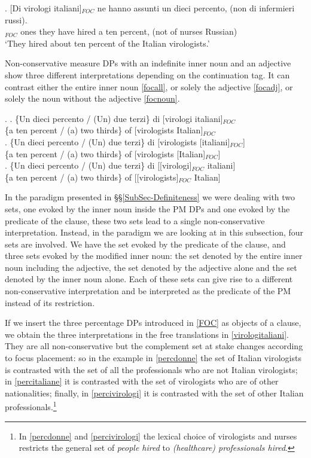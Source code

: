 \documentclass[charis, linguex]{glossa}
\begin{document}
\exg. [Di virologi italiani]$_{FOC}$ ne hanno assunti un dieci percento, (non di infermieri russi).\\
	 [of virologists Italian]$_{FOC}$ ones {they have} hired a ten percent, (not of nurses Russian)\\
	\glt   `They hired about ten percent of the Italian virologists.'  \label{fronted}

 
Non-conservative measure DPs with an indefinite inner noun and an adjective show three different interpretations depending on the continuation tag. It can contrast either the entire inner noun \ref{focall}, or solely the adjective \ref{focadj}, or solely the noun without the adjective \ref{focnoun}.

\ex. \label{FOC} \ag. \{Un dieci percento / (Un) due terzi\} di [virologi italiani]$_{FOC}$ \\ 
          \{a ten percent    /     (a) two thirds\} of [virologists Italian]$_{FOC}$ \\ \label{focall}
     \bg. \{Un dieci percento / (Un) due terzi\} di [virologists [italiani]$_{FOC}$] \\
	      \{a ten percent / (a) two thirds\} of [virologists [Italian]$_{FOC}$]  \\ \label{focadj}
	 \cg. \{Un dieci percento / (Un) due terzi\} di [[virologi]$_{FOC}$ italiani] \\
	      \{a ten percent / (a) two thirds\} of [[virologists]$_{FOC}$ Italian]  \\ \label{focnoun}

		  
		  
In the paradigm presented in \S\S\ref{SubSec-Definiteness} we were dealing with two sets, one evoked by the inner noun inside the PM DPs and one evoked by the predicate of the clause, these two sets lead to a single non-conservative interpretation. Instead, in the paradigm we are looking at in this subsection, four sets are involved. We have the set evoked by the predicate of the clause, and three sets evoked by the modified inner noun: the set denoted by the entire inner noun including the adjective, the set denoted by the adjective alone and the set denoted by the inner noun alone. Each of these sets can give rise to a different non-conservative interpretation and be interpreted as the predicate of the PM instead of its restriction. 

If we insert the three percentage DPs introduced in \ref{FOC} as objects of a clause, we obtain the three interpretations in the free translations in \ref{virologitaliani}. They are all non-conservative but the complement set at stake changes according to focus placement: so in the example in \ref{percdonne} the set of Italian virologists is contrasted with the set of all the professionals who are not Italian virologists; in \ref{percitaliane} it is contrasted with the set of virologists who are of other nationalities; finally, in \ref{percivirologi} it is contrasted with the set of other Italian professionals.\footnote{In \ref{percdonne} and \ref{percivirologi} the lexical choice of virologists and nurses restricts the general set of \textit{people hired} to \textit{(healthcare) professionals hired}.}
\end{document}
